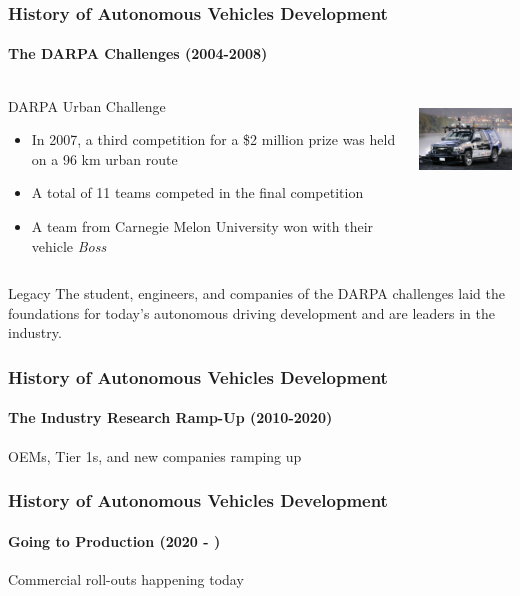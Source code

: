 \begin{frame}
\frametitle{History of Autonomous Vehicles Development}
\framesubtitle{The DARPA Challenges (2004-2008)}
\begin{columns}[T]
    \begin{column}{.7\textwidth}
    DARPA Urban Challenge\footnotemark
    \begin{itemize}
        \item In 2007, a third competition for a \$2 million prize was held on
            a 96 km urban route
        \item A total of 11 teams competed in the final competition
        \item A team from Carnegie Melon University won with their vehicle
            \emph{Boss}
    \end{itemize}
    \end{column}
    \begin{column}{.3\textwidth}
    \centering
    \includegraphics[height=2.25cm]{images/darpa_boss.jpg} \\
    \tiny{\cite{CMUUrbanChallenge}}
    \end{column}
\end{columns}
\begin{block}{Legacy}
The student, engineers, and companies of the DARPA challenges laid the
foundations for today's autonomous driving development and are leaders in the
industry.
\end{block}
\end{frame}

\begin{frame}
\frametitle{History of Autonomous Vehicles Development}
\framesubtitle{The Industry Research Ramp-Up (2010-2020)}
OEMs, Tier 1s, and new companies ramping up
\end{frame}

\begin{frame}
\frametitle{History of Autonomous Vehicles Development}
\framesubtitle{Going to Production (2020 - )}
Commercial roll-outs happening today
\end{frame}